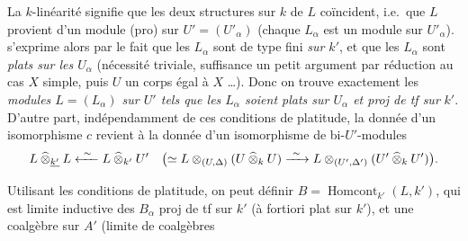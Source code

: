 \documentclass[11pt,a4paper]{article}
\begin{document}
La $k$-linéarité signifie que les deux structures sur $k$ de $L$ coïncident,
i.e.\ que $L$ provient d'un module (pro) sur $U' = (U'_{\alpha})$ (chaque
$L_{\alpha}$ est un module sur $U'_{\alpha}$).    s'exprime alors par le fait que les $L_{\alpha}$ sont
  de type fini \emph{sur $k'$}, et que les
$L_{\alpha}$ sont \emph{plats sur les $U_{\alpha}$} (nécessité triviale,
suffisance un petit argument par réduction au cas $X$ simple, puis $U$ un corps
égal à $X$ …). Donc on trouve exactement les \emph{modules
$L = (L_{\alpha})$ sur $U'$ tels que les $L_{\alpha}$ soient plats sur
$U_{\alpha}$ et proj de tf sur} $k'$. D'autre part, indépendamment
de ces conditions de platitude, la donnée d'un isomorphisme $c$ revient à la
donnée d'un isomorphisme de bi-$U'$-modules 
\[ L \mathbin{\widehat{\otimes}}_{\uncertain{k'}} L \xleftarrow{\ \sim\ }
   L \mathbin{\widehat{\otimes}}_{k'} U'
   \quad \bigl( \simeq L \otimes_{(U,\Delta)}
   (U \mathbin{\widehat{\otimes}}_{k} U)
   \xrightarrow{\ \sim\ } L \otimes_{(U',\Delta')}
   (U' \mathbin{\widehat{\otimes}}_{k} U') \bigr) . \]

 Utilisant les conditions de platitude, on peut définir
$B = \operatorname{Homcont}_{k'}(L,k')$, qui est limite inductive des
$B_{\alpha}$ proj de tf sur $k'$ (à fortiori  plat sur $k'$), et une
coalgèbre sur $A'$ (limite de coalgèbres


\end{document}
